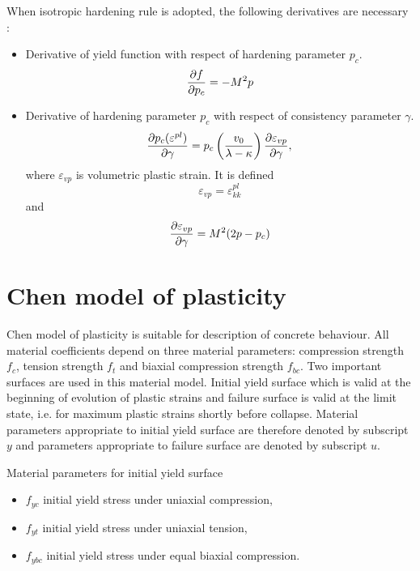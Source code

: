 When isotropic hardening rule is adopted, the following derivatives are necessary :
\begin  {itemize}
\item Derivative of yield function with respect of hardening parameter $p_c$.
\begin{equation}
\mbox{$\displaystyle\frac{\partial{f}}{\partial{p_c}}$} = -M^2p
\end{equation}
\item Derivative of hardening parameter $p_c$ with respect of consistency parameter $\gamma$.
\begin{equation}
\mbox{$\displaystyle\frac{\partial{p_c(\varepsilon^{pl})}}{\partial{\gamma}}$} = 
p_c\left(\frac{v_0}{\lambda - \kappa}\right)\mbox{$\displaystyle\frac{\partial{\varepsilon_{vp}}}{\partial{\gamma}}$},
\end{equation}
where $\varepsilon_{vp}$ is volumetric plastic strain. It is defined 
\begin {equation}
\varepsilon_{vp} = \varepsilon^{pl}_{kk}
\end{equation}
and
\begin {equation}
\mbox{$\displaystyle\frac{\partial{\varepsilon_{vp}}}{\partial{\gamma}}$} = M^2(2p-p_c)
\end{equation}
\end {itemize}

\section{Chen model of plasticity}

Chen model of plasticity is suitable for description of concrete behaviour. All material
coefficients depend on three material parameters:
compression strength $f_{c}$,
tension strength $f_{t}$ and
biaxial compression strength $f_{bc}$.
Two important surfaces are used in this material model. Initial yield surface
which is valid at the beginning of evolution of plastic strains and failure
surface is valid at the limit state, i.e. for maximum plastic strains shortly
before collapse. Material parameters appropriate to initial yield surface are
therefore denoted by subscript $y$ and parameters appropriate to failure surface
are denoted by subscript $u$.

Material parameters for initial yield surface
\begin{itemize}
\item $f_{yc}$  initial yield stress under uniaxial compression,
\item $f_{yt}$  initial yield stress under uniaxial tension,
\item $f_{ybc}$ initial yield stress under equal biaxial compression.
\end{itemize}

